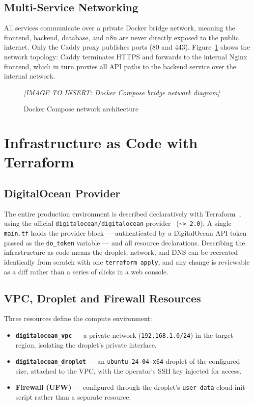 \documentclass[12pt, a4paper, oneside]{report}
\newcommand{\imagePlaceholder}[2][8cm]{%
  \begin{mdframed}[backgroundcolor=cheebolightgray,linecolor=gray!40]
    \centering
    \vspace{#1}
    \textit{\color{gray}[IMAGE TO INSERT: #2]}
    \vspace{8mm}
  \end{mdframed}
}
\begin{document}
\subsection{Multi-Service Networking}

All services communicate over a private Docker bridge network,
meaning the frontend, backend, database, and n8n are never directly
exposed to the public internet. Only the Caddy proxy publishes ports
(80 and 443). Figure~\ref{fig:docker-network} shows the network
topology: Caddy terminates HTTPS and forwards to the internal Nginx
frontend, which in turn proxies all API paths to the backend service
over the internal network.

\begin{figure}[H]
  \centering
  \imagePlaceholder[7cm]{Docker Compose bridge network diagram}
  \caption{Docker Compose network architecture}
  \label{fig:docker-network}
\end{figure}

\section{Infrastructure as Code with Terraform}

\subsection{DigitalOcean Provider}

The entire production environment is described declaratively with
Terraform~\cite{terraform}, using the official \texttt{digitalocean/digitalocean}
provider~\cite{digitalocean} (\texttt{\textasciitilde> 2.0}). A single \texttt{main.tf}
holds the provider block --- authenticated by a DigitalOcean API
token passed as the \texttt{do\_token} variable --- and all resource
declarations. Describing the infrastructure as code means the droplet,
network, and DNS can be recreated identically from scratch with one
\texttt{terraform apply}, and any change is reviewable as a diff
rather than a series of clicks in a web console.

\subsection{VPC, Droplet and Firewall Resources}

Three resources define the compute environment:

\begin{itemize}[leftmargin=*,itemsep=2pt]
  \item \textbf{\texttt{digitalocean\_vpc}} --- a private network
        (\texttt{192.168.1.0/24}) in the target region, isolating the
        droplet's private interface.
  \item \textbf{\texttt{digitalocean\_droplet}} --- an
        \texttt{ubuntu-24-04-x64} droplet of the configured size,
        attached to the VPC, with the operator's SSH key injected for
        access.
  \item \textbf{Firewall (UFW)} --- configured through the droplet's
        \texttt{user\_data} cloud-init script rather than a separate
        resource.
\end{itemize}
\end{document}
